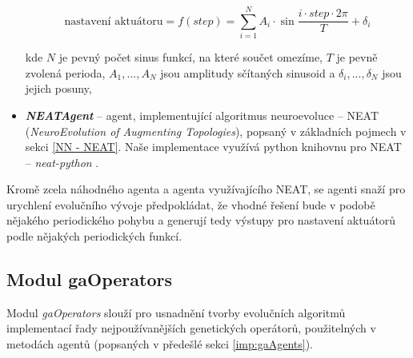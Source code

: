 \begin{itemize}
        \begin{equation}
            \text{nastavení aktuátoru} = f(step) = \sum_{i=1}^{N}A_i\cdot\sin\frac{i\cdot
            step\cdot2\pi}{T} + \delta_i
        \end{equation}

        kde $N$ je pevný počet sinus funkcí, na které součet omezíme, $T$ je
        pevně zvolená perioda, $A_1,...,A_N$ jsou amplitudy sčítaných
        sinusoid a $\delta_i,...,\delta_N$ jsou jejich posuny,
    \item \textbf{\emph{NEATAgent}} -- agent, implementující algoritmus
        neuroevoluce -- NEAT (\emph{NeuroEvolution of Augmenting Topologies}),
        popsaný v základních pojmech v sekci \ref{NN - NEAT}. Naše implementace
        využívá python knihovnu pro NEAT -- \emph{neat-python}
        \citet{McIntyre_neat-python}.
\end{itemize}

Kromě zcela náhodného agenta a agenta využívajícího NEAT, se agenti snaží pro
urychlení evolučního vývoje předpokládat, že vhodné řešení bude v podobě
nějakého periodického pohybu a generují tedy výstupy pro nastavení aktuátorů
podle nějakých periodických funkcí. 

\subsection{Modul gaOperators} \label{imp:gaOperators}
Modul \emph{gaOperators} slouží pro usnadnění tvorby evolučních algoritmů
implementací řady nejpoužívanějších genetických operátorů, použitelných v
metodách agentů (popsaných v předešlé sekci \ref{imp:gaAgents}). 

